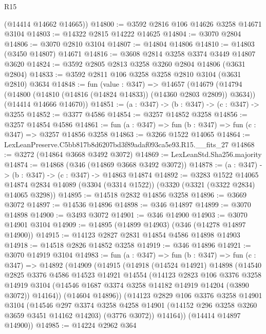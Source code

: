 \begin{lexlean}{R15}
\begin{coremodule}
      (@14414 @14662 @14665))
@14800 := @3592 @2816 @106 @14626 @3258 @14671 @3104
@14803 := @14322 @2815 @14222 @14625
@14804 := @3070 @2804
@14806 := @3070 @2810 @3104
@14807 := @14804 @14806
@14810 := @14803 (@3450 @14807) @14671
@14816 := @3608 @2814 @3258 @3374 @3449 @14807 @3620
@14824 := @3592 @2805 @2813 @3258 @3260 @2804 @14806 (@3631 @2804)
@14833 := @3592 @2811 @106 @3258 @3258 @2810 @3104 (@3631 @2810) @3634
@14848 := fun (value : @347) =>
  @14657
    (@14679
      (@14794 (@14800 (@14810 (@14816 (@14824 @14833)) (@14360 @2803 @2809)) @3634))
      (@14414 @14666 @14670))
@14851 := (a : @347) -> (b : @347) -> (c : @347) -> @3255
@14852 := @3377 @4586
@14854 := @3257 @14852 @3258
@14856 := @3257 @14854 @4586
@14861 := fun (a : @347) => fun (b : @347) => fun (c : @347) => @3257 @14856 @3258
@14863 := @3266 @1522 @14065
@14864 := LexLeanPreserve.C5bb817b8d6207bd3f89adaf093ca5e93.R15.__fits_27
@14868 := @3272 (@14864 @3668 @3492 @3072)
@14869 := LexLeanStd.Sha256.majority
@14874 := @14868 (@346 (@14869 @3668 @3492 @3072))
@14878 := (a : @347) -> (b : @347) -> (c : @347) -> @14863 @14874
@14892 := @3283
    @1522
    @14065
    @14874
    @2834
    @14089
    (@3304 (@3314 @1522))
    (@3320 (@3321 (@3322 @2834) @14065 @3298))
@14895 := @14518 @2832 @14856 @3258
@14896 := @3669 @3072
@14897 := @14536 @14896
@14898 := @346 @14897
@14899 := @3070 @14898
@14900 := @3493 @3072
@14901 := @346 @14900
@14903 := @3070 @14901 @3104
@14909 := @14895 (@14899 @14903) (@346 (@14278 @14897 @14900))
@14915 := @14123 @2827 @2831 @14854 @4586 @14898 @14903
@14918 := @14518 @2826 @14852 @3258
@14919 := @346 @14896
@14921 := @3070 @14919 @3104
@14983 := fun (a : @347) =>
  fun (b : @347) =>
  fun (c : @347) =>
  @14892
    (@14909
      (@14915
        (@14918
          (@14524 @14921)
          @14898
          (@14540
            @2825
            @3376
            @4586
            @14523
            @14921
            @14554
            (@14123
              @2823
              @106
              @3376
              @3258
              @14919
              @3104
              (@14546 @1687 @3374 @3258 @14182 @14919 @14204 (@3890 @3072))
              @14164))
          (@14604 @14896))
        (@14123
          @2829
          @106
          @3376
          @3258
          @14901
          @3104
          (@14546
            @297
            @3374
            @3258
            @4258
            @14901
            (@14152 @296 @3258 @3260 @3659 @3451 @14162 @14203)
            (@3776 @3072))
          @14164))
      (@14414 @14897 @14900))
@14985 := @14224 @2962 @364

\end{coremodule}
\end{lexlean}
